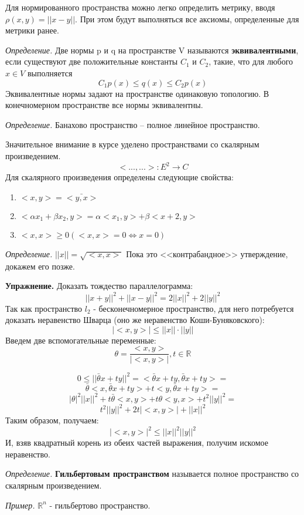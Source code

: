 \documentclass[12pt]{article}
\newcommand{\example}{{\itshape Пример. }}
\newcommand{\equals}{\Leftrightarrow}
\newcommand{\defi}{{\itshape Определение. }}
\newcommand{\exc}{{\bfseries Упражнение. }}
\renewcommand{\leq}{\leqslant}
\renewcommand{\geq}{\geqslant}
\begin{document}
	Для нормированного пространства можно легко определить метрику, вводя $\rho(x,y) = ||x-y||$. При этом будут выполняться все аксиомы,
	определенные для метрики ранее.
	
	\defi Две нормы p и q на пространстве V называются \textbf{эквивалентными}, если существуют две положительные константы $C_1$ и $C_2$,
	такие, что для любого $x \in V$ выполняется 
	$$C_1 p(x) \leq q(x) \leq C_2 p(x)$$
	Эквивалентные нормы задают на пространстве одинаковую топологию. В конечномерном пространстве все нормы эквивалентны.
	
	\defi Банахово пространство -- полное линейное пространство.
	
	Значительное внимание в курсе уделено пространствами со скалярным произведением.
	$$<...,...> : E^2 \rightarrow C$$
	Для скалярного произведения определены следующие свойства:
	\begin{enumerate}
		\item $<x,y> = \bar{<y,x>}$
		\item $<\alpha x_1 + \beta x_2, y> = \alpha <x_1, y> + \beta <x+2, y>$
		\item $<x, x> \geq 0 (<x, x> = 0 \equals x = 0)$
	\end{enumerate}
	
	\defi $||x|| = \sqrt{<x, x>}$ {\color{gray} Пока это <<контрабандное>> утверждение, докажем его позже.}
	
	\exc Доказать тождество параллелограмма: 
	$$||x+y||^2 + ||x-y||^2 = 2 ||x||^2 + 2 ||y||^2$$
	Так как пространство $l_2$ - бесконечномерное пространство, для него потребуется доказать неравенство Шварца (оно же неравенство
	Коши-Буняковского):
	$$|<x, y>| \leq ||x|| \cdot ||y||$$
	Введем две вспомогательные переменные:
	$$\theta = \frac{<x, y>}{|<x, y>|}, t \in \mathbb{R}$$
	
	$$0 \leq ||\bar{\theta} x + t y||^2 = <\bar{\theta} x + t y, \bar{\theta} x + t y> = $$
	$$\bar{\theta} <x, \bar{\theta} x + t y> + t <y, \bar{\theta} x + t y> = $$
	$$|\theta|^2 ||x||^2 + t \bar{\theta} <x, y> + t \theta <y, x> + t^2 ||y||^2 = $$
	$$t^2 ||y||^2 + 2t |<x,y>| + ||x||^2$$
	Таким образом, получаем:
	$$|<x, y>|^2 \leq ||x||^2 ||y||^2$$
	И, взяв квадратный корень из обеих частей выражения, получим искомое неравенство.
	
	\defi \textbf{Гильбертовым пространством} называется полное пространство со скалярным произведением.
	
	\example $\mathbb{R}^n$ - гильбертово пространство.
\end{document}
